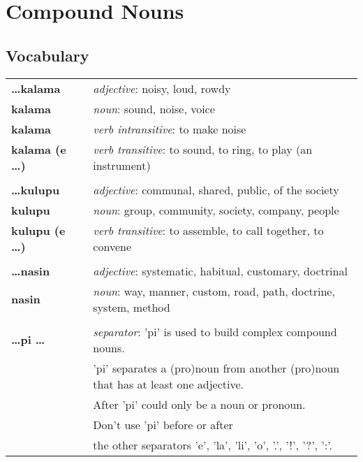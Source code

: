 \section{Compound Nouns}
%
\subsection*{Vocabulary}
%
\begin{supertabular}{p{2,5cm}|ll}
%
\textbf{\dots kalama} && \textit{adjective}: noisy, loud, rowdy \\ %
\textbf{kalama} && \textit{noun}: sound, noise, voice \\ 
\textbf{kalama} && \textit{verb intransitive}: to make noise \\ %
\textbf{kalama (e \dots)} && \textit{verb transitive}: to sound, to ring, to play (an instrument) \\ %
 && \\ %
%
\textbf{\dots kulupu} && \textit{adjective}: communal, shared, public, of the society \\ %
\textbf{kulupu} && \textit{noun}: group, community, society, company, people \\ %
\textbf{kulupu (e \dots)} && \textit{verb transitive}: to assemble, to call together, to convene \\ %
 && \\ %
%
\textbf{\dots nasin} && \textit{adjective}: systematic, habitual, customary, doctrinal \\ %
\textbf{nasin} && \textit{noun}: way, manner, custom, road, path, doctrine, system, method \\ %
 && \\ %
%
\textbf{\dots pi \dots } && \textit{separator}: 'pi' is used to build complex compound nouns. \\ && 'pi' separates a (pro)noun from another (pro)noun that has at least one adjective. \\ && After 'pi' could only be a noun or pronoun. \\ && Don't use 'pi' before or after \\ && the other separators 'e', 'la', 'li', 'o', '.', '!', '?', ':'.  \\ %
\end{supertabular} \\
%
\newpage
%
